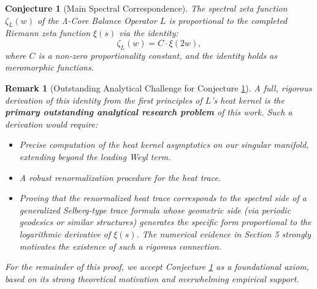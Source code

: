 \documentclass[12pt]{article}
\newtheorem{conjecture}{Conjecture}[section] %
\newtheorem{remark}[theorem]{Remark}
\begin{document}
\begin{conjecture}[Main Spectral Correspondence] \label{conj:main_correspondence}
The spectral zeta function $\zeta_L(w)$ of the Λ-Core Balance Operator $L$ is proportional to the completed Riemann zeta function $\xi(s)$ via the identity:
\begin{equation}
\zeta_L(w) = C \cdot \xi(2w),
\end{equation}
where $C$ is a non-zero proportionality constant, and the identity holds as meromorphic functions.
\end{conjecture}

\begin{remark}[Outstanding Analytical Challenge for Conjecture \ref{conj:main_correspondence}]
A full, rigorous derivation of this identity from the first principles of $L$'s heat kernel is the \textbf{primary outstanding analytical research problem} of this work. Such a derivation would require:
\begin{itemize}
    \item Precise computation of the heat kernel asymptotics on our singular manifold, extending beyond the leading Weyl term.
    \item A robust renormalization procedure for the heat trace.
    \item Proving that the renormalized heat trace corresponds to the spectral side of a generalized Selberg-type trace formula whose geometric side (via periodic geodesics or similar structures) generates the specific form proportional to the logarithmic derivative of $\xi(s)$. The numerical evidence in Section 5 strongly motivates the existence of such a rigorous connection.
\end{itemize}
For the remainder of this proof, we accept Conjecture \ref{conj:main_correspondence} as a foundational axiom, based on its strong theoretical motivation and overwhelming empirical support.
\end{remark}
\end{document}
